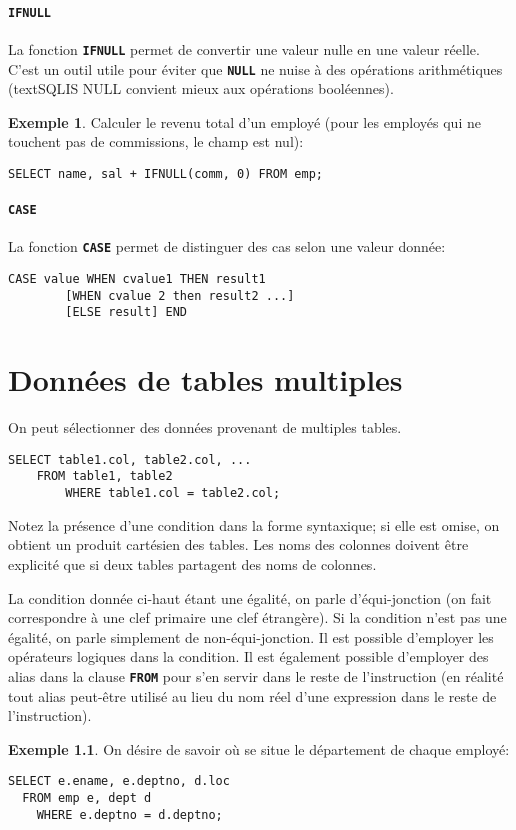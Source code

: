 \documentclass[a4paper, 12pt]{report}
\newcommand{\textSQL}[1]{\texttt{\textbf{#1}}}
\theoremstyle{definition} \newtheorem{ex}{Exemple}
\begin{document}
\subsubsection{\textSQL{IFNULL}}
La fonction \textSQL{IFNULL} permet de convertir une valeur nulle en une valeur réelle. C'est un outil utile pour éviter que \textSQL{NULL} ne nuise à des opérations arithmétiques (textSQL{IS NULL} convient mieux aux opérations booléennes).
\begin{ex}
Calculer le revenu total d'un employé (pour les employés qui ne touchent pas de commissions, le champ est nul):
	\begin{lstlisting}[frame=single]
 SELECT name, sal + IFNULL(comm, 0) FROM emp;
\end{lstlisting}
\end{ex}

\subsubsection{\textSQL{CASE}}
La fonction \textSQL{CASE} permet de distinguer des cas selon une valeur donnée:
	\begin{lstlisting}[frame=single]
 CASE value WHEN cvalue1 THEN result1
		[WHEN cvalue 2 then result2 ...]
		[ELSE result] END
\end{lstlisting}

\chapter{Données de tables multiples}
On peut sélectionner des données provenant de multiples tables.
	\begin{lstlisting}[frame=single]
 SELECT table1.col, table2.col, ...
    FROM table1, table2
		WHERE table1.col = table2.col;
\end{lstlisting}
Notez la présence d'une condition dans la forme syntaxique; si elle est omise, on obtient un produit cartésien des tables. Les noms des colonnes doivent être explicité que si deux tables partagent des noms de colonnes.

La condition donnée ci-haut étant une égalité, on parle d'équi-jonction (on fait correspondre à une clef primaire une clef étrangère). Si la condition n'est pas une égalité, on parle simplement de non-équi-jonction. Il est possible d'employer les opérateurs logiques dans la condition. Il est également possible d'employer des alias dans la clause \textSQL{FROM} pour s'en servir dans le reste de l'instruction (en réalité tout alias peut-être utilisé au lieu du nom réel d'une expression dans le reste de l'instruction).
\begin{ex}
On désire de savoir où se situe le département de chaque employé:
\begin{lstlisting}[frame=single]
SELECT e.ename, e.deptno, d.loc
  FROM emp e, dept d
	WHERE e.deptno = d.deptno;
\end{lstlisting}
\end{ex}
\end{document}
